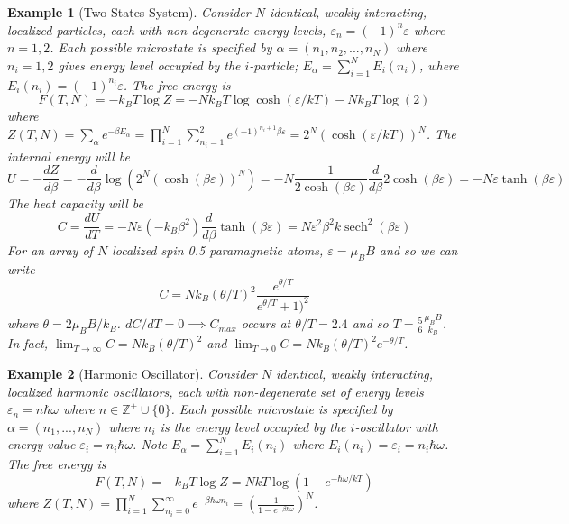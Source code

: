 \documentclass[a4paper]{article}
\DeclareMathOperator{\sech}{sech}
\newtheorem{eg}{Example}[section]
\theoremstyle{new}
\begin{document}
\begin{eg}[Two-States System]
Consider $N$ identical, weakly interacting, localized particles, each with non-degenerate energy levels, $\varepsilon_n=(-1)^n\varepsilon$ where $n=1,2$. Each possible microstate is specified by $\alpha=(n_1,n_2,...,n_N)$ where $n_i=1,2$ gives energy level occupied by the $i$-particle; $E_\alpha=\sum_{i=1}^NE_i(n_i)$, where $E_i(n_i)=(-1)^{n_i}\varepsilon$. The free energy is
$$F(T,N)=-k_BT\log Z=-Nk_BT\log\cosh(\varepsilon/kT) -Nk_BT\log(2)$$
where $Z(T,N)=\sum_\alpha e^{-\beta E_\alpha}=\prod_{i=1}^N\sum_{n_i=1}^2e^{(-1)^{n_i+1}\beta\varepsilon}=2^N(\cosh(\varepsilon/kT))^N$. The internal energy will be
$$U=-\frac{dZ}{d\beta}=-\frac{d}{d\beta}\log(2^N(\cosh(\beta\varepsilon))^N)=-N\frac{1}{2\cosh(\beta\varepsilon)}\frac{d}{d\beta}2\cosh(\beta\varepsilon)=-N\varepsilon\tanh(\beta\varepsilon)$$
The heat capacity will be
$$C=\frac{dU}{dT}=-N\varepsilon(-k_B\beta^2)\frac{d}{d\beta}\tanh(\beta\varepsilon)=N\varepsilon^2\beta^2k\sech^2(\beta\varepsilon)$$
For an array of $N$ localized spin 0.5 paramagnetic atoms, $\varepsilon=\mu_BB$ and so we can write
$$C=Nk_B(\theta/T)^2\frac{e^{\theta/T}}{e^{\theta/T}+1)^2}$$
where $\theta=2\mu_BB/k_B$. $dC/dT=0\implies C_{max}$ occurs at $\theta/T=2.4$ and so $T=\frac{5}{6}\frac{\mu_BB}{k_B}$. In fact, $\lim_{T\rightarrow\infty}C=Nk_B(\theta/T)^2$ and $\lim_{T\rightarrow0}C=Nk_B(\theta/T)^2e^{-\theta/T}$.
\end{eg}
\begin{eg}[Harmonic Oscillator]
Consider $N$ identical, weakly interacting, localized harmonic oscillators, each with non-degenerate set of energy levels $\varepsilon_n=n\hbar\omega$ where $n\in\mathbb{Z}^+\cup\{0\}$. Each possible microstate is specified by $\alpha=(n_1,...,n_N)$ where $n_i$ is the energy level occupied by the $i$-oscillator with energy value $\varepsilon_i=n_i\hbar\omega$. Note $E_\alpha=\sum_{i=1}^NE_i(n_i)$ where $E_i(n_i)=\varepsilon_i=n_i\hbar\omega$. The free energy is
$$F(T,N)=-k_BT\log Z= NkT\log(1-e^{-\hbar\omega/kT})$$
where $Z(T,N)=\prod_{i=1}^N\sum_{n_i=0}^\infty e^{-\beta\hbar\omega n_i}=(\frac{1}{1-e^{-\beta\hbar\omega}})^N$. 
\end{eg}
\newpage
\end{document}
